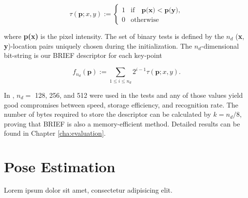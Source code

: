 $$\tau(\textbf{p}; x, y) :=
\begin{cases}
  1 &\mbox{if}\quad \textbf{p(x)} < \textbf{p(y)},\\
  0 &\mbox{otherwise}
\end{cases}$$

where \textbf{p(x)} is the pixel intensity. The set of binary tests is defined by the $n_{d}$ (\textbf{x}, \textbf{y})-location pairs uniquely chosen during the initialization. The $n_{d}$-dimensional bit-string is our BRIEF descriptor for each key-point

$$f_{n_{d}}(\textbf{p}) := \sum_{1 \le i \le n_{d}} 2^{i-1} \tau(\textbf{p}; x, y).$$

In \cite{Calonder2010}, $n_{d}=$ 128, 256, and 512 were used in the tests and any of those values yield good compromises between speed, storage efficiency, and recognition rate. The number of bytes required to store the descriptor can be calculated by $k = n_{d}/8$, proving that BRIEF is also a memory-efficient method. Detailed results can be found in Chapter \ref{cha:evaluation}.


\section{Pose Estimation} %
\label{sec:ar_library_for_the_web:pose_estimation}

Lorem ipsum dolor sit amet, consectetur adipisicing elit.


